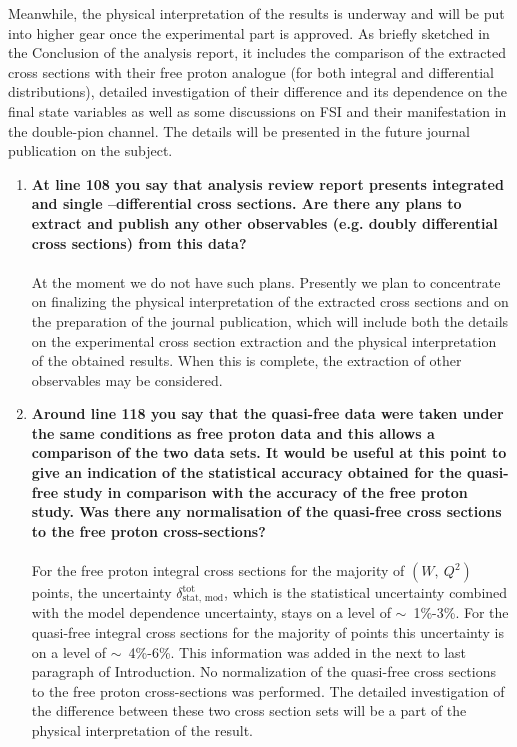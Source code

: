 \documentclass[,superscriptaddress,showpacs,amssymb,amsmath,amsfonts,linenumbers,article]{revtex4-1}
\begin{document}
Meanwhile, the physical interpretation of the results is underway and will be put into higher gear once the experimental part is approved. As briefly sketched in the Conclusion of the analysis report, it includes the comparison of the extracted cross sections with their free proton analogue (for both integral and differential distributions), detailed investigation of their difference and its dependence on the final state variables as well as some discussions on FSI and their manifestation in the double-pion channel. The details will be presented in the future journal publication on the subject. 

\vspace{0.5cm}

\begin{enumerate}[label=\textbf{\arabic*}.]

\item {\bf At line 108 you say that analysis review report presents integrated and single –differential cross sections. Are there any plans to extract and publish any other observables (e.g. doubly differential cross sections) from this data?}\\ \\
At the moment we do not have such plans. Presently we plan to concentrate on finalizing the physical interpretation of the extracted cross sections  and on the preparation of the journal publication, which will include both the details on the experimental cross section extraction and the physical interpretation of the obtained results. When this is complete, the extraction of other observables may be considered.



\item {\bf Around line 118 you say that the quasi-free data were taken under the same conditions as free proton data and this allows a comparison of the two data sets. It would be useful at this point to give an indication of the statistical accuracy obtained for the quasi-free study in comparison with the accuracy of the free proton study. Was there any normalisation of the quasi-free cross sections to the free proton cross-sections?}\\ \\
For the free proton integral cross sections for the majority of $(W,~Q^{2})$ points, the uncertainty $\delta_{\text{stat,~mod}}^{\text{tot}}$, which is the statistical uncertainty combined with the model dependence uncertainty, stays on a level of $\sim$~1\%-3\%. For the quasi-free integral cross sections for the majority of points this uncertainty is on a level of $\sim$~4\%-6\%. This information was added in the next to last paragraph of Introduction. No normalization of the quasi-free cross sections to the free proton cross-sections was performed. The detailed investigation of the difference between these two cross section sets will be a part of the physical interpretation of the result.


\end{enumerate}
\end{document}
